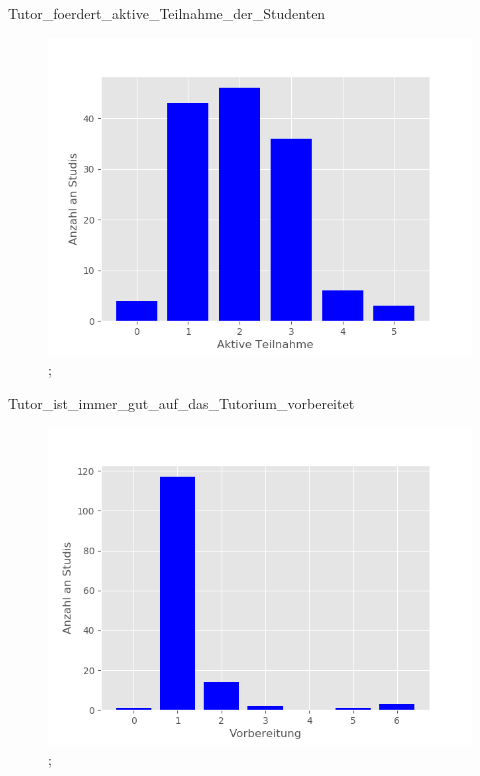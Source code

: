 \documentclass[10pt]{beamer}
\begin{document}
\begin{frame}[fragile]{Tutor_foerdert_aktive_Teilnahme_der_Studenten} 
 \begin{figure}
 \includegraphics[width= 0.9\linewidth]{./PDFcreater/Plots/Tutor_foerdert_aktive_Teilnahme_der_Studenten.png};
 \end{figure}
 \end{frame}
\begin{frame}[fragile]{Tutor_ist_immer_gut_auf_das_Tutorium_vorbereitet} 
 \begin{figure}
 \includegraphics[width= 0.9\linewidth]{./PDFcreater/Plots/Tutor_ist_immer_gut_auf_das_Tutorium_vorbereitet.png};
 \end{figure}
 \end{frame}
\end{document}
